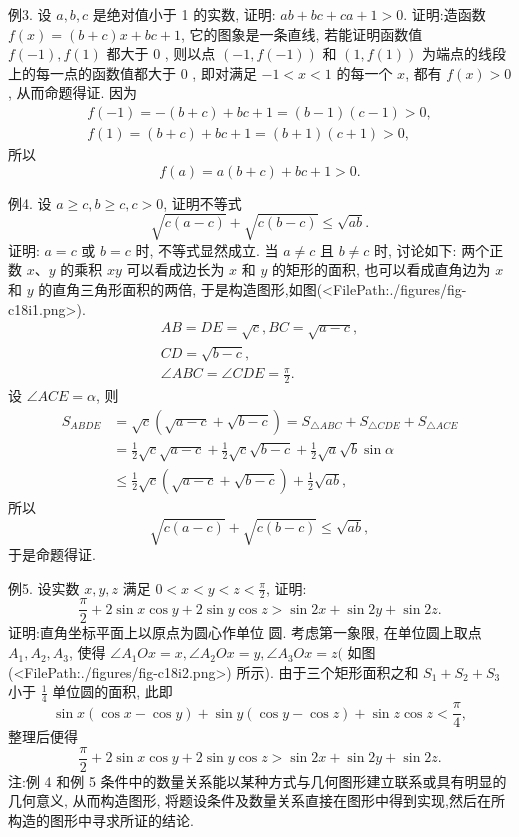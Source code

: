 例3. 设 $a, b, c$ 是绝对值小于 1 的实数, 证明: $a b+b c+c a+1>0$.
证明:造函数 $f(x)=(b+c) x+b c+1$, 它的图象是一条直线, 若能证明函数值 $f(-1), f(1)$ 都大于 0 , 则以点 $(-1, f(-1))$ 和 $(1, f(1))$ 为端点的线段上的每一点的函数值都大于 0 , 即对满足 $-1<x<1$ 的每一个 $x$, 都有 $f(x)>0$, 从而命题得证.
因为
$$
\begin{gathered}
f(-1)=-(b+c)+b c+1=(b-1)(c-1)>0, \\
f(1)=(b+c)+b c+1=(b+1)(c+1)>0,
\end{gathered}
$$
所以
$$
f(a)=a(b+c)+b c+1>0 .
$$



例4. 设 $a \geqslant c, b \geqslant c, c>0$, 证明不等式
$$
\sqrt{c(a-c)}+\sqrt{c(b-c)} \leqslant \sqrt{a b} .
$$
证明: $a=c$ 或 $b=c$ 时, 不等式显然成立.
当 $a \neq c$ 且 $b \neq c$ 时, 讨论如下: 两个正数 $x 、 y$ 的乘积 $x y$ 可以看成边长为 $x$ 和 $y$ 的矩形的面积, 也可以看成直角边为 $x$ 和 $y$ 的直角三角形面积的两倍, 于是构造图形,如图(<FilePath:./figures/fig-c18i1.png>).
$$
\begin{gathered}
A B=D E=\sqrt{c}, B C=\sqrt{a-c}, \\
C D=\sqrt{b-c}, \\
\angle A B C=\angle C D E=\frac{\pi}{2} .
\end{gathered}
$$
设 $\angle A C E=\alpha$, 则
$$
\begin{aligned}
S_{A B D E} & =\sqrt{c}(\sqrt{a-c}+\sqrt{b-c})=S_{\triangle A B C}+S_{\triangle C D E}+S_{\triangle A C E} \\
& =\frac{1}{2} \sqrt{c} \sqrt{a-c}+\frac{1}{2} \sqrt{c} \sqrt{b-c}+\frac{1}{2} \sqrt{a} \sqrt{b} \sin \alpha \\
& \leqslant \frac{1}{2} \sqrt{c}(\sqrt{a-c}+\sqrt{b-c})+\frac{1}{2} \sqrt{a b},
\end{aligned}
$$
所以
$$
\sqrt{c(a-c)}+\sqrt{c(b-c)} \leqslant \sqrt{a b},
$$
于是命题得证.



例5. 设实数 $x, y, z$ 满足 $0<x<y<z<\frac{\pi}{2}$, 证明:
$$
\frac{\pi}{2}+2 \sin x \cos y+2 \sin y \cos z>\sin 2 x+\sin 2 y+\sin 2 z .
$$
证明:直角坐标平面上以原点为圆心作单位 圆.
考虑第一象限, 在单位圆上取点 $A_1, A_2, A_3$, 使得 $\angle A_1 O x=x, \angle A_2 O x=y, \angle A_3 O x=z($ 如图(<FilePath:./figures/fig-c18i2.png>) 所示).
由于三个矩形面积之和 $S_1+S_2+S_3$ 小于 $\frac{1}{4}$ 单位圆的面积, 此即
$$
\sin x(\cos x-\cos y)+\sin y(\cos y-\cos z)+\sin z \cos z<\frac{\pi}{4},
$$
整理后便得
$$
\frac{\pi}{2}+2 \sin x \cos y+2 \sin y \cos z>\sin 2 x+\sin 2 y+\sin 2 z .
$$
注:例 4 和例 5 条件中的数量关系能以某种方式与几何图形建立联系或具有明显的几何意义, 从而构造图形, 将题设条件及数量关系直接在图形中得到实现,然后在所构造的图形中寻求所证的结论.



